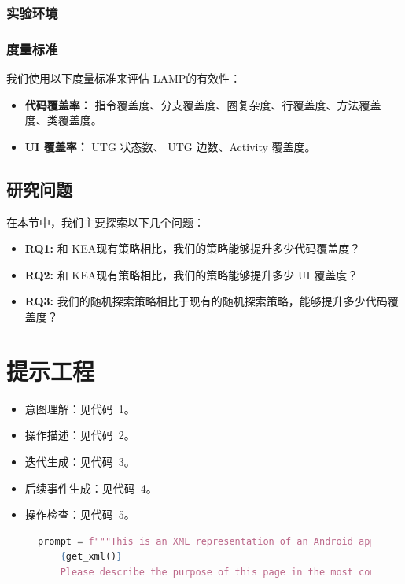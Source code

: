 \documentclass[twocolumn, 10pt]{article}
\newcommand{\kea}{K{\small\MakeUppercase{ea}}}
\newcommand{\lamp}{L{\small\MakeUppercase{amp}}}
\begin{document}
\subsubsection{实验环境}

\subsubsection{度量标准}
\label{sec:metrics}

我们使用以下度量标准来评估 \lamp 的有效性：

\begin{itemize}
    \item \textbf{代码覆盖率：} 指令覆盖度、分支覆盖度、圈复杂度、行覆盖度、方法覆盖度、类覆盖度。
    \item \textbf{UI 覆盖率：} UTG 状态数、 UTG 边数、Activity 覆盖度。
\end{itemize}

\subsection{研究问题}

在本节中，我们主要探索以下几个问题：

\begin{itemize}
    \item \textbf{RQ1:} 和 \kea 现有策略相比，我们的策略能够提升多少代码覆盖度？
    \item \textbf{RQ2:} 和 \kea 现有策略相比，我们的策略能够提升多少 UI 覆盖度？
    \item \textbf{RQ3:} 我们的随机探索策略相比于现有的随机探索策略，能够提升多少代码覆盖度？
\end{itemize}   

\appendix

\section{提示工程}
\label{sec:prompt}

\begin{itemize}
    \item 意图理解：见代码~1。
    \item 操作描述：见代码~2。
    \item 迭代生成：见代码~3。
    \item 后续事件生成：见代码~4。
    \item 操作检查：见代码~5。
\end{itemize}

\begin{figure}[t]
\centering
\begin{lstlisting}[language=Python,caption=意图理解]
    prompt = f"""This is an XML representation of an Android application page:
    {get_xml()}
    Please describe the purpose of this page in the most concise language possible."""
\end{lstlisting}
\label{fig:intent}
\end{figure}
\end{document}
